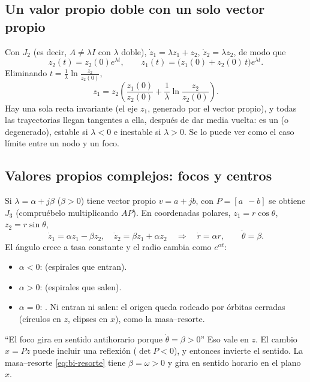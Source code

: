 \subsection{Un valor propio doble con un solo vector propio}

Con $J_2$ (es decir, $A\neq\lambda I$ con $\lambda$ doble), $\dot z_1=\lambda z_1+z_2$, $\dot z_2=\lambda z_2$, de modo que
\[
  z_2(t)=z_2(0)e^{\lambda t},\qquad z_1(t)=\bigl(z_1(0)+z_2(0)\,t\bigr)e^{\lambda t} .
\]
Eliminando $t=\frac1\lambda\ln\frac{z_2}{z_2(0)}$,
\[
  z_1=z_2\left(\frac{z_1(0)}{z_2(0)}+\frac1\lambda\ln\frac{z_2}{z_2(0)}\right) .
\]
Hay una sola recta invariante (el eje $z_1$, generado por el vector propio), y todas las trayectorias llegan tangentes a ella, después de dar media vuelta: es un  (o degenerado), estable si $\lambda<0$ e inestable si $\lambda>0$. Se lo puede ver como el caso límite entre un nodo y un foco.

\subsection{Valores propios complejos: focos y centros}

Si $\lambda=\alpha+j\beta$ ($\beta>0$) tiene vector propio $v=a+jb$, con $P=[a\ \ -b]$ se obtiene $J_3$ (compruébelo multiplicando $AP$). En coordenadas polares, $z_1=r\cos\theta$, $z_2=r\sin\theta$,
\[
  \dot z_1=\alpha z_1-\beta z_2,\quad \dot z_2=\beta z_1+\alpha z_2
  \quad\Longrightarrow\quad
  \dot r=\alpha r,\qquad \dot\theta=\beta .
\]
El ángulo crece a tasa constante y el radio cambia como $e^{\alpha t}$:
\begin{itemize}
  \item $\alpha<0$:  (espirales que entran).
  \item $\alpha>0$:  (espirales que salen).
  \item $\alpha=0$: . Ni entran ni salen: el origen queda rodeado por órbitas cerradas (círculos en $z$, elipses en $x$), como la masa--resorte.
\end{itemize}

\begin{trampa}[label=tr:bi-giro]{``El foco gira en sentido antihorario porque $\dot\theta=\beta>0$''}
Eso vale en $z$. El cambio $x=Pz$ puede incluir una reflexión ($\det P<0$), y entonces invierte el sentido. La masa--resorte \eqref{eq:bi-resorte} tiene $\beta=\omega>0$ y gira en sentido horario en el plano $x$.
\end{trampa}

